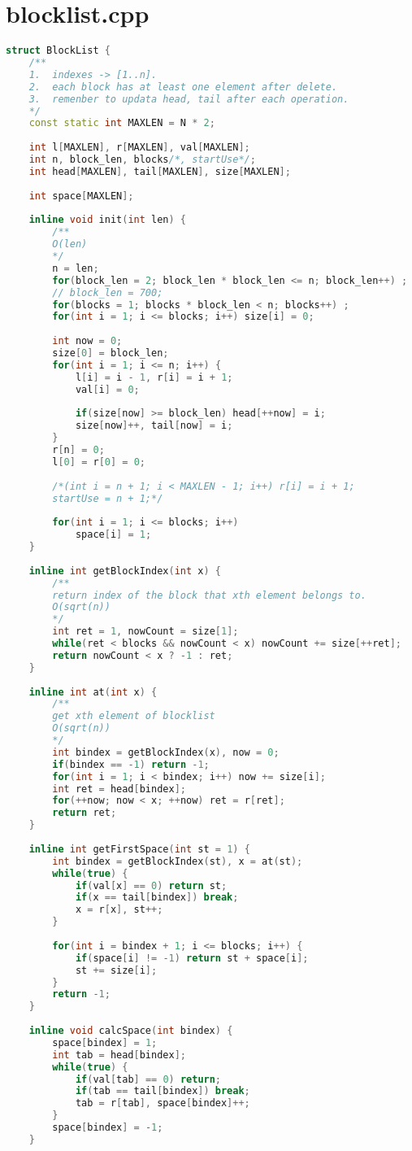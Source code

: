 \section{blocklist.cpp}
\begin{lstlisting}[language=c++]
struct BlockList {
	/**
	1.	indexes -> [1..n].
	2.	each block has at least one element after delete.
	3.	remenber to updata head, tail after each operation.
	*/
	const static int MAXLEN = N * 2;
	
	int l[MAXLEN], r[MAXLEN], val[MAXLEN];
	int n, block_len, blocks/*, startUse*/;
	int head[MAXLEN], tail[MAXLEN], size[MAXLEN];
	
	int space[MAXLEN];
	
	inline void init(int len) {
		/**
		O(len)
		*/
		n = len;
		for(block_len = 2; block_len * block_len <= n; block_len++) ;
		// block_len = 700;
		for(blocks = 1; blocks * block_len < n; blocks++) ;
		for(int i = 1; i <= blocks; i++) size[i] = 0;
		
		int now = 0;
		size[0] = block_len;
		for(int i = 1; i <= n; i++) {
			l[i] = i - 1, r[i] = i + 1;
			val[i] = 0;
			
			if(size[now] >= block_len) head[++now] = i;
			size[now]++, tail[now] = i;
		}
		r[n] = 0;
		l[0] = r[0] = 0;
		
		/*(int i = n + 1; i < MAXLEN - 1; i++) r[i] = i + 1;
		startUse = n + 1;*/
		
		for(int i = 1; i <= blocks; i++)
			space[i] = 1;
	}
	
	inline int getBlockIndex(int x) {
		/**
		return index of the block that xth element belongs to.
		O(sqrt(n))
		*/
		int ret = 1, nowCount = size[1];
		while(ret < blocks && nowCount < x) nowCount += size[++ret];
		return nowCount < x ? -1 : ret;
	}
	
	inline int at(int x) {
		/**
		get xth element of blocklist
		O(sqrt(n))
		*/
		int bindex = getBlockIndex(x), now = 0;
		if(bindex == -1) return -1;
		for(int i = 1; i < bindex; i++) now += size[i];
		int ret = head[bindex];
		for(++now; now < x; ++now) ret = r[ret];
		return ret;
	}
	
	inline int getFirstSpace(int st = 1) {
		int bindex = getBlockIndex(st), x = at(st);
		while(true) {
			if(val[x] == 0) return st;
			if(x == tail[bindex]) break;
			x = r[x], st++;
		}
		
		for(int i = bindex + 1; i <= blocks; i++) {
			if(space[i] != -1) return st + space[i];
			st += size[i];
		}
		return -1;
	}
	
	inline void calcSpace(int bindex) {
		space[bindex] = 1;
		int tab = head[bindex];
		while(true) {
			if(val[tab] == 0) return;
			if(tab == tail[bindex]) break;
			tab = r[tab], space[bindex]++;
		}
		space[bindex] = -1;
	}
	

\end{lstlisting}
